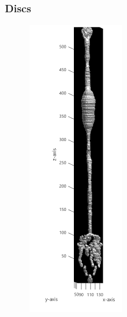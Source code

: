 \documentclass[12pt]{exam}
\begin{document}
	\subsubsection{Discs}
	\begin{figure}
		\includegraphics[width=\linewidth]{discBC}
		\label{discBC}
	\end{figure} 
\end{document}
